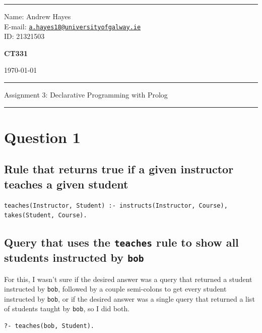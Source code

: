 \documentclass[a4paper]{article}
\begin{document}
\hrule \medskip
\begin{minipage}{0.295\textwidth} 
    \raggedright
    \footnotesize 
    Name: Andrew Hayes \\
    E-mail: \href{mailto://a.hayes18@universityofgalway.ie}{\texttt{a.hayes18@universityofgalway.ie}}  \hfill\\   
    ID: 21321503 \hfill
\end{minipage}
\begin{minipage}{0.4\textwidth} 
    \centering 
    \vspace{0.4em}
    \Large 
    \textbf{CT331} \\ 
\end{minipage}
\begin{minipage}{0.295\textwidth} 
    \raggedleft
    \today
\end{minipage}
\medskip\hrule 
\begin{center}
    \normalsize
    Assignment 3: Declarative Programming with Prolog
\end{center}
\hrule

\section{Question 1}
\subsection{Rule that returns true if a given instructor teaches a given student}
\begin{verbatim}
teaches(Instructor, Student) :- instructs(Instructor, Course), takes(Student, Course).
\end{verbatim}

\subsection{Query that uses the \texttt{teaches} rule to show all students instructed by \texttt{bob}}
For this, I wasn't sure if the desired answer was a query that returned a student instructed by \texttt{bob}, followed by 
a couple semi-colons to get every student instructed by \texttt{bob}, or if the desired answer was a single query that 
returned a list of students taught by \texttt{bob}, so I did both.
\begin{verbatim}
?- teaches(bob, Student).
\end{verbatim}
\end{document}
